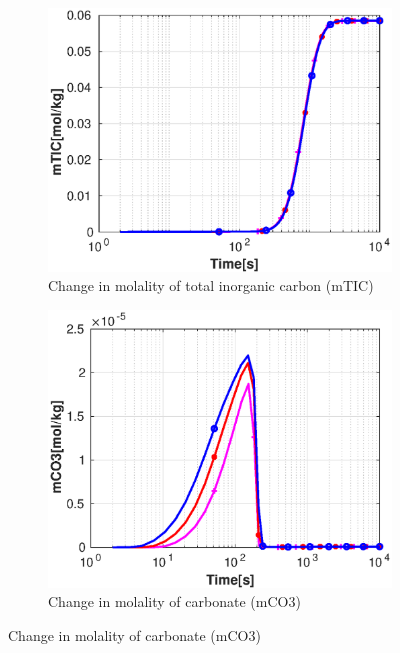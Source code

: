 \begin{figure}[!h]
        \hfill
        \begin{subfigure}{.5\linewidth}
            \centering
        \includegraphics[width=\textwidth]{PICTURES/with_grid_mTIC.eps}
        \caption{Change in molality of total inorganic carbon (mTIC)}
        \label{fig:gridmTIC}
    \end{subfigure}%
        \hfill
        \begin{subfigure}{.5\linewidth}
            \centering
        \includegraphics[width=\textwidth]{PICTURES/with_grid_mCO3.eps}
        \caption{Change in molality of carbonate (mCO3)}
        \label{fig:gridmCO3}
    \end{subfigure}%

\end{figure}
